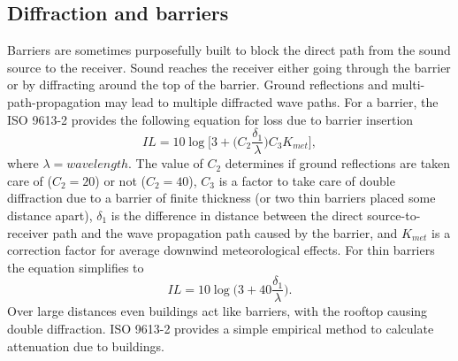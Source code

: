 \subsection{Diffraction and barriers}
Barriers are sometimes purposefully built to block the direct path from the sound source to the receiver. Sound reaches the receiver either going through the barrier or by diffracting around the top of the barrier. Ground reflections and multi-path-propagation may lead to multiple diffracted wave paths. For a barrier, the ISO 9613-2 \cite{ISO9613} provides the following equation for loss due to barrier insertion
\begin{equation}
    IL = 10\log\bigg[3+\bigg(C_2\frac{\delta_1}{\lambda}\bigg)C_3K_{met}\bigg],
\end{equation}
where $\lambda=wavelength$. The value of $C_2$ determines if ground reflections are taken care of ($C_2 = 20$) or not ($C_2 = 40$), $C_3$ is a factor to take care of double diffraction due to a barrier of finite thickness (or two thin barriers placed some distance apart), $\delta_1$ is the difference in distance between the direct source-to-receiver path and the wave propagation path caused by the barrier, and $K_{met}$ is a correction factor for average downwind meteorological effects. For thin barriers the equation simplifies to 
\begin{equation}
    IL = 10\log\bigg(3+40\frac{\delta_1}{\lambda}\bigg). 
\end{equation}
Over large distances even buildings act like barriers, with the rooftop causing double diffraction. ISO 9613-2 \cite{ISO9613} provides a simple empirical method to calculate attenuation due to buildings.


